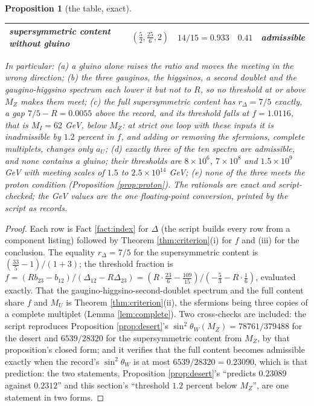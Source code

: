 \documentclass[11pt]{article}
\newtheorem{proposition}[theorem]{Proposition}
\theoremstyle{definition}
\newcommand{\Dl}{\Delta}
\begin{document}
\begin{proposition}[the table, exact]
\begin{center}
\begin{tabular}{@{}lllll@{}}
supersymmetric content without gluino & $(\tfrac52, \tfrac{25}{6}, 2)$ & $14/15 = 0.933$ & $0.41$ & admissible \\
\bottomrule
\end{tabular}
\end{center}
In particular: (a) a gluino alone raises the ratio and moves the meeting in the wrong direction; (b) the three gauginos, the higgsinos, a second doublet and the gaugino-higgsino spectrum each lower it but not to $R$, so no threshold at or above $M_{Z}$ makes them meet; (c) the full supersymmetric content has $r_{\Dl} = 7/5$ exactly, a gap $7/5 - R = 0.0055$ above the record, and its threshold falls at $f = 1.0116$, that is $M_{I} = 62$ GeV, below $M_{Z}$: at strict one loop with these inputs it is inadmissible by $1.2$ percent in $f$, and adding or removing the sfermions, complete multiplets, changes only $a_{U}$; (d) exactly three of the ten spectra are admissible, and none contains a gluino; their thresholds are $8 \times 10^{6}$, $7 \times 10^{8}$ and $1.5 \times 10^{9}$ GeV with meeting scales of $1.5$ to $2.5 \times 10^{14}$ GeV; (e) none of the three meets the proton condition (Proposition \ref{prop:proton}). The rationals are exact and script-checked; the GeV values are the one floating-point conversion, printed by the script as records.
\end{proposition}

\begin{proof}
Each row is Fact \ref{fact:index} for $\Dl$ (the script builds every row from a component listing) followed by Theorem \ref{thm:criterion}(i) for $f$ and (iii) for the conclusion. The equality $r_{\Dl} = 7/5$ for the supersymmetric content is $(\tfrac{33}{5} - 1)/(1 + 3)$; the threshold fraction is $f = (Rb_{23} - b_{12})/(\Dl_{12} - R\Dl_{23}) = (R \cdot \tfrac{23}{6} - \tfrac{109}{15})/(-\tfrac53 - R \cdot \tfrac16)$, evaluated exactly. That the gaugino-higgsino-second-doublet spectrum and the full content share $f$ and $M_{U}$ is Theorem \ref{thm:criterion}(ii), the sfermions being three copies of a complete multiplet (Lemma \ref{lem:complete}). Two cross-checks are included: the script reproduces Proposition \ref{prop:desert}'s $\sin^{2}\theta_{W}(M_{Z}) = 78761/379488$ for the desert and $6539/28320$ for the supersymmetric content from $M_{Z}$, by that proposition's closed form; and it verifies that the full content becomes admissible exactly when the record's $\sin^{2}\theta_{W}$ is at most $6539/28320 = 0.23090$, which is that prediction: the two statements, Proposition \ref{prop:desert}'s ``predicts $0.23089$ against $0.2312$'' and this section's ``threshold $1.2$ percent below $M_{Z}$'', are one statement in two forms.
\end{proof}
\end{document}

